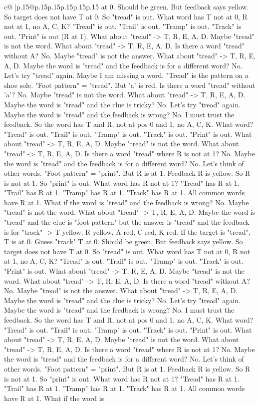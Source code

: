 \documentclass{article}
\begin{document}
{\begin{supertabular}{c@{$\;$}|p{.15\linewidth}@{}p{.15\linewidth}p{.15\linewidth}p{.15\linewidth}p{.15\linewidth}p{.15\linewidth}}
{{{at 0. Should be green. But feedback says yellow. So target does not have T at 0. So "tread" is out. What word has T not at 0, R not at 1, no A, C, K? "Tread" is out. "Trail" is out. "Tramp" is out. "Track" is out. "Print" is out (R at 1). What about "tread" {-}> T, R, E, A, D. Maybe "tread" is not the word. What about "tread" {-}> T, R, E, A, D. Is there a word "tread" without A? No. Maybe "tread" is not the answer. What about "tread" {-}> T, R, E, A, D. Maybe the word is "tread" and the feedback is for a different word? No. Let's try "tread" again. Maybe I am missing a word. "Tread" is the pattern on a shoe sole. "Foot pattern" = "tread". But 'a' is red. Is there a word "tread" without 'a'? No. Maybe "tread" is not the word. What about "tread" {-}> T, R, E, A, D. Maybe the word is "tread" and the clue is tricky? No. Let's try "tread" again. Maybe the word is "tread" and the feedback is wrong? No. I must trust the feedback. So the word has T and R, not at pos 0 and 1, no A, C, K. What word? "Tread" is out. "Trail" is out. "Tramp" is out. "Track" is out. "Print" is out. What about "tread" {-}> T, R, E, A, D. Maybe "tread" is not the word. What about "tread" {-}> T, R, E, A, D. Is there a word "tread" where R is not at 1? No. Maybe the word is "tread" and the feedback is for a different word? No. Let's think of other words. "Foot pattern" = "print". But R is at 1. Feedback R is yellow. So R is not at 1. So "print" is out. What word has R not at 1? "Tread" has R at 1. "Trail" has R at 1. "Tramp" has R at 1. "Track" has R at 1. All common words have R at 1. What if the word is "tread" and the feedback is wrong? No. Maybe "tread" is not the word. What about "tread" {-}> T, R, E, A, D. Maybe the word is "tread" and the clue is "foot pattern" but the answer is "tread" and the feedback is for "track" {-}> T yellow, R yellow, A red, C red, K red. If the target is "tread", T is at 0. Guess "track" T at 0. Should be green. But feedback says yellow. So target does not have T at 0. So "tread" is out. What word has T not at 0, R not at 1, no A, C, K? "Tread" is out. "Trail" is out. "Tramp" is out. "Track" is out. "Print" is out. What about "tread" {-}> T, R, E, A, D. Maybe "tread" is not the word. What about "tread" {-}> T, R, E, A, D. Is there a word "tread" without A? No. Maybe "tread" is not the answer. What about "tread" {-}> T, R, E, A, D. Maybe the word is "tread" and the clue is tricky? No. Let's try "tread" again. Maybe the word is "tread" and the feedback is wrong? No. I must trust the feedback. So the word has T and R, not at pos 0 and 1, no A, C, K. What word? "Tread" is out. "Trail" is out. "Tramp" is out. "Track" is out. "Print" is out. What about "tread" {-}> T, R, E, A, D. Maybe "tread" is not the word. What about "tread" {-}> T, R, E, A, D. Is there a word "tread" where R is not at 1? No. Maybe the word is "tread" and the feedback is for a different word? No. Let's think of other words. "Foot pattern" = "print". But R is at 1. Feedback R is yellow. So R is not at 1. So "print" is out. What word has R not at 1? "Tread" has R at 1. "Trail" has R at 1. "Tramp" has R at 1. "Track" has R at 1. All common words have R at 1. What if the word is }}}
\end{supertabular}}
\end{document}
